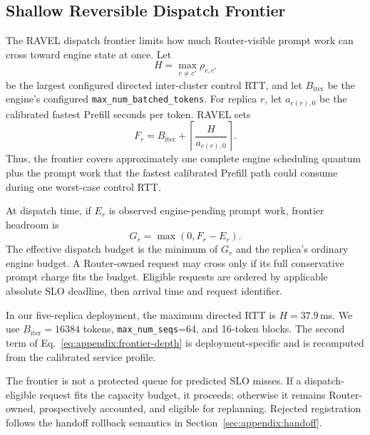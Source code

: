 \documentclass[letterpaper,twocolumn,10pt]{article}
\begin{document}
\subsection{Shallow Reversible Dispatch Frontier}
\label{sec:appendix:frontier}

The RAVEL dispatch frontier limits how much Router-visible prompt work can
cross toward engine state at once.
Let
\begin{equation}
    H
    =
    \max_{c\neq c'}
       \rho_{c,c'}
    \label{eq:appendix:control-horizon}
\end{equation}
be the largest configured directed inter-cluster control RTT, and let
$B_{\mathrm{iter}}$ be the engine's configured
\texttt{max\_num\_batched\_tokens}.
For replica $r$, let $a_{c(r),0}$ be the calibrated fastest Prefill seconds per
token.
RAVEL sets
\begin{equation}
    F_r
    =
    B_{\mathrm{iter}}
    +
    \left\lceil
       \frac{H}{a_{c(r),0}}
    \right\rceil .
    \label{eq:appendix:frontier-depth}
\end{equation}
Thus, the frontier covers approximately one complete engine scheduling
quantum plus the prompt work that the fastest calibrated Prefill path could
consume during one worst-case control RTT.

At dispatch time, if $E_r$ is observed engine-pending prompt work, frontier
headroom is
\begin{equation}
    G_r
    =
    \max(0,F_r-E_r).
    \label{eq:appendix:frontier-headroom}
\end{equation}
The effective dispatch budget is the minimum of $G_r$ and the replica's
ordinary engine budget.
A Router-owned request may cross only if its full conservative prompt charge
fits the budget.
Eligible requests are ordered by applicable absolute SLO deadline, then
arrival time and request identifier.

In our five-replica deployment, the maximum directed RTT is
$H=37.9$\,ms.
We use $B_{\mathrm{iter}}=16384$ tokens,
\texttt{max\_num\_seqs}=64, and 16-token blocks.
The second term of Eq.~\ref{eq:appendix:frontier-depth} is deployment-specific
and is recomputed from the calibrated service profile.

The frontier is not a protected queue for predicted SLO misses.
If a dispatch-eligible request fits the capacity budget, it proceeds;
otherwise it remains Router-owned, prospectively accounted, and eligible for
replanning.
Rejected registration follows the handoff rollback semantics in
Section~\ref{sec:appendix:handoff}.
\end{document}
